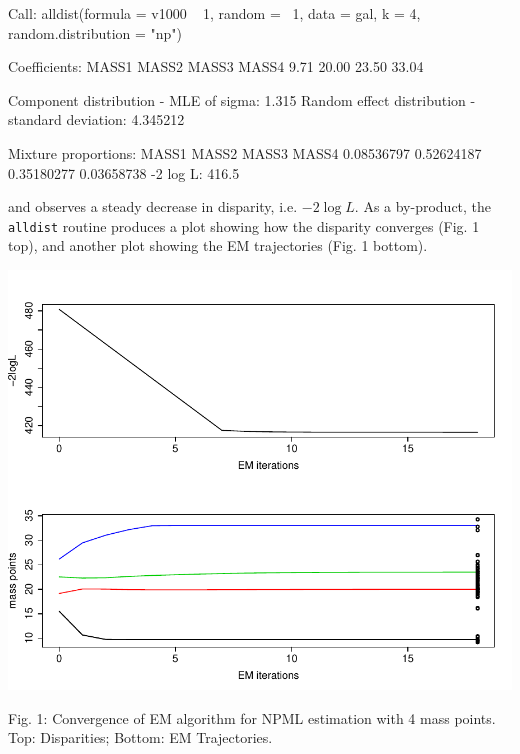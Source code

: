\documentclass[a4paper]{article}
\begin{document}
\begin{landscape}
\begin{Schunk}
\begin{Soutput}
Call:  alldist(formula = v1000 ~ 1, random = ~1, data = gal, k = 4,      random.distribution = "np") 

Coefficients:
MASS1  MASS2  MASS3  MASS4  
 9.71  20.00  23.50  33.04  

Component distribution - MLE of sigma:	   1.315 
Random effect distribution - standard deviation:	   4.345212 

Mixture proportions:
     MASS1       MASS2       MASS3       MASS4  
0.08536797  0.52624187  0.35180277  0.03658738  
-2 log L:	    416.5 
\end{Soutput}
\end{Schunk}
and observes a steady decrease in disparity, i.e. $-2\log L$. As a by-product, 
the {\tt alldist} routine produces a plot 
showing how the disparity converges (Fig. 1 top), and another plot showing 
the EM trajectories (Fig. 1 bottom).

\begin{minipage}{21cm}
\includegraphics{npmlreg-v-008}

Fig. 1: Convergence of EM algorithm for NPML estimation with 4 mass points.  Top: Disparities; Bottom: EM Trajectories.
\end{minipage}


\end{landscape}
\end{document}
